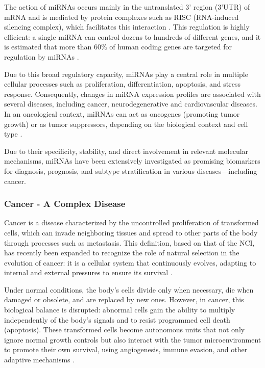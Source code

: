The action of miRNAs occurs mainly in the untranslated 3' region (3'UTR) of mRNA and is mediated by protein complexes 
such as RISC (RNA-induced silencing complex), which facilitates this interaction \cite{regulatory_mecha_mirnaGulyaeva2016}. This regulation 
is highly efficient: a single miRNA can control dozens to hundreds of different genes, and it is estimated that more 
than $60\%$ of human coding genes are targeted for regulation by miRNAs \cite{role_mirna_Calaf2023}.

Due to this broad regulatory capacity, miRNAs play a central role in multiple cellular processes such as proliferation, 
differentiation, apoptosis, and stress response. Consequently, changes in miRNA expression profiles are associated with 
several diseases, including cancer, neurodegenerative and cardiovascular diseases. In an oncological context, miRNAs can 
act as oncogenes (promoting tumor growth) or as tumor suppressors, depending on the biological context and cell type \cite{regulatory_mecha_mirnaGulyaeva2016}.

Due to their specificity, stability, and direct involvement in relevant molecular mechanisms, miRNAs have been extensively 
investigated as promising biomarkers for diagnosis, prognosis, and subtype stratification in various diseases—including cancer.

\subsubsection*{Cancer - A Complex Disease}
Cancer is a disease characterized by the uncontrolled proliferation of transformed cells, which can invade neighboring 
tissues and spread to other parts of the body through processes such as metastasis. This definition, based on that of the 
NCI, has recently been expanded to recognize the role of natural selection in the evolution of cancer: it is a cellular 
system that continuously evolves, adapting to internal and external pressures to ensure its survival \cite{def_of_cancer_Brown2023,NCI2021}.

Under normal conditions, the body's cells divide only when necessary, die when damaged or obsolete, and are replaced by 
new ones. However, in cancer, this biological balance is disrupted: abnormal cells gain the ability to multiply 
independently of the body's signals and to resist programmed cell death (apoptosis). These transformed cells become 
autonomous units that not only ignore normal growth controls but also interact with the tumor microenvironment to 
promote their own survival, using angiogenesis, immune evasion, and other adaptive mechanisms \cite{def_of_cancer_Brown2023,NCI2021}.

